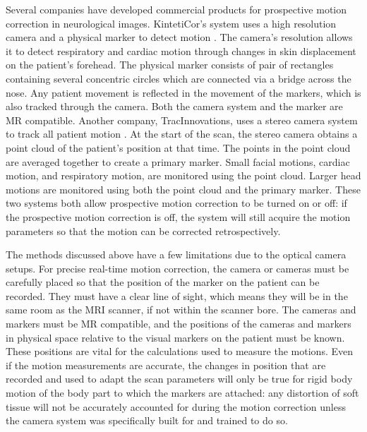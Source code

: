 Several companies have developed commercial products for prospective motion correction in neurological images. KintetiCor's system uses a high resolution camera and a physical marker to detect motion \cite{kineticor}. The camera's resolution allows it to detect respiratory and cardiac motion through changes in skin displacement on the patient's forehead. The physical marker consists of pair of rectangles containing several concentric circles which are connected via a bridge across the nose. Any patient movement is reflected in the movement of the markers, which is also tracked through the camera. Both the camera system and the marker are MR compatible. Another company, TracInnovations, uses a stereo camera system to track all patient motion \cite{tracinnovations}. At the start of the scan, the stereo camera obtains a point cloud of the patient's position at that time. The points in the point cloud are averaged together to create a primary marker. Small facial motions, cardiac motion, and respiratory motion, are monitored using the point cloud. Larger head motions are monitored using both the point cloud and the primary marker. These two systems both allow prospective motion correction to be turned on or off: if the prospective motion correction is off, the system will still acquire the motion parameters so that the motion can be corrected retrospectively.

The methods discussed above have a few limitations due to the optical camera setups. For precise real-time motion correction, the camera or cameras must be carefully placed so that the position of the marker on the patient can be recorded. They must have a clear line of sight, which means they will be in the same room as the MRI scanner, if not within the scanner bore. The cameras and markers must be MR compatible, and the positions of the cameras and markers in physical space relative to the visual markers on the patient must be known. These positions are vital for the calculations used to measure the motions. Even if the motion measurements are accurate, the changes in position that are recorded and used to adapt the scan parameters will only be true for rigid body motion of the body part to which the markers are attached: any distortion of soft tissue will not be accurately accounted for during the motion correction unless the camera system was specifically built for and trained to do so. 

